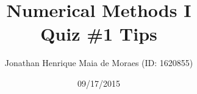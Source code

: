 \title{Numerical Methods I \\ Quiz \#1 Tips}
\author{Jonathan Henrique Maia de Moraes (ID: 1620855)}
\date{09/17/2015}
\maketitle